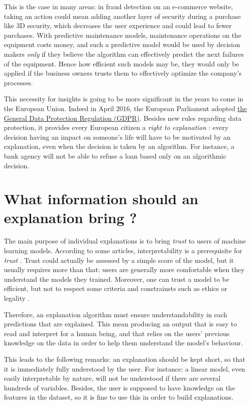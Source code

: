 \documentclass[a4paper,11pt]{kth-mag}
\begin{document}
This is the case in many areas: in fraud detection on an e-commerce website,  taking an action could mean adding another layer of security during a purchase like 3D security, which decreases the user experience and could lead to fewer purchases. With predictive maintenance models, maintenance operations on the equipment costs money, and such a predictive model would be used by decision makers \textit{only} if they believe the algorithm can effectively predict the next failures of the equipment. Hence how efficient such models may be, they would only be applied if the business owners trusts them to effectively optimize the company's processes.

This necessity for insights is going to be more significant in the years to come in the European Union. Indeed in April 2016, the European Parliament adopted \href{http://eur-lex.europa.eu/eli/reg/2016/679/oj}{the General Data Protection Regulation (GDPR)}. Besides new rules regarding data protection, it provides every European citizen a \textit{right to explanation} \cite{euregulation}: every decision having an impact on someone's life will have to be motivated by an explanation, even when the decision is taken by an algorithm. For instance, a bank agency will not be able to refuse a loan based only on an algorithmic decision.

\section{What information should an explanation bring ?}

The main purpose of individual explanations is to bring \textit{trust} to users of machine learning models. According to some articles, interpretability is a prerequisite for \textit{trust} \cite{lime} \cite{mythos}. Trust could actually be assessed by a simple score of the model, but it usually requires more than that: users are generally more comfortable when they understand the models they trained. Moreover, one can trust a model to be efficient, but not to respect some criteria and constrainsts such as ethics or legality \cite{mythos}.

Therefore, an explanation algorithm must ensure understandability in each predictions that are explained. This mean producing an output that is easy to read and interpret for a human being, and that relies on the users' previous knowledge on the data in order to help them understand the model's behaviour.

This leads to the following remarks: an explanation should be kept short, so that it is immediately fully understood by the user. For instance: a linear model, even easily interpretable by nature, will not be understood if there are several hundreds of variables. Besides, the user is supposed to have knowledge on the features in the dataset, so it is fine to use this in order to build explanations.
\end{document}
